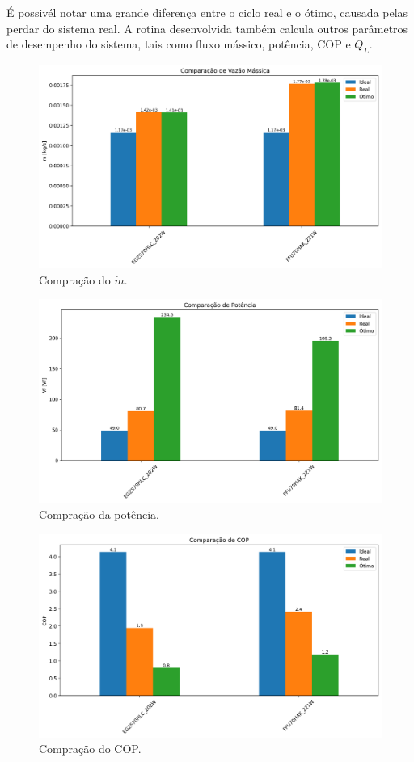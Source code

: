 É possivél notar uma grande diferença entre o ciclo real e o ótimo, causada pelas perdar do sistema real. A rotina desenvolvida também calcula outros parâmetros de desempenho do sistema, tais como fluxo mássico, potência, COP e ${Q_L}$.

\begin{figure}[h]
    \centering
    \includegraphics[width=0.8\linewidth]{Imagens/Desenvolvimento/barras_m.png}
    \caption{Compração do $\dot{m}$.}
    \label{fig:barras m}
\end{figure}

\begin{figure}[h]
    \centering
    \includegraphics[width=0.8\linewidth]{Imagens/Desenvolvimento/barras_W.png}
    \caption{Compração da potência.}
    \label{fig:barras W}
\end{figure}

\begin{figure}[h]
    \centering
    \includegraphics[width=0.8\linewidth]{Imagens/Desenvolvimento/barras_COP.png}
    \caption{Compração do COP.}
    \label{fig:barras COP}
\end{figure}


